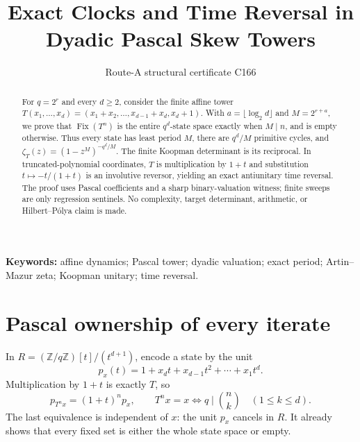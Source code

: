 \documentclass[10pt]{article}
\title{\vspace{-1.55em}Exact Clocks and Time Reversal in Dyadic Pascal Skew Towers}
\author{Route-A structural certificate C166}
\date{}
\begin{document}
\maketitle
\begin{abstract}
For $q=2^r$ and every $d\ge2$, consider the finite affine tower
$T(x_1,\ldots,x_d)=(x_1+x_2,\ldots,x_{d-1}+x_d,x_d+1)$.
With $a=\lfloor\log_2d\rfloor$ and $M=2^{r+a}$, we prove that
$\operatorname{Fix}(T^n)$ is the entire $q^d$-state space exactly when
$M\mid n$, and is empty otherwise.  Thus every state has least period $M$,
there are $q^d/M$ primitive cycles, and
$\zeta_T(z)=(1-z^M)^{-q^d/M}$.  The finite Koopman determinant is its
reciprocal.  In truncated-polynomial coordinates, $T$ is multiplication by
$1+t$ and substitution $t\mapsto-t/(1+t)$ is an involutive reversor, yielding
an exact antiunitary time reversal.  The proof uses Pascal coefficients and a
sharp binary-valuation witness; finite sweeps are only regression sentinels.
No complexity, target determinant, arithmetic, or Hilbert--P\'olya claim is
made.
\end{abstract}
\noindent\textbf{Keywords:} affine dynamics; Pascal tower; dyadic valuation;
exact period; Artin--Mazur zeta; Koopman unitary; time reversal.

\smallskip
{}

\section{Pascal ownership of every iterate}
In $R=(\mathbb Z/q\mathbb Z)[t]/(t^{d+1})$, encode a state by the unit
\[
p_x(t)=1+x_dt+x_{d-1}t^2+\cdots+x_1t^d.                    \tag{1}
\]
Multiplication by $1+t$ is exactly $T$, so
\[
p_{T^nx}=(1+t)^np_x,\qquad
T^nx=x\Longleftrightarrow q\mid\binom nk\quad(1\le k\le d). \tag{2}
\]
The last equivalence is independent of $x$: the unit $p_x$ cancels in $R$.
It already shows that every fixed set is either the whole state space or
empty.
\end{document}
